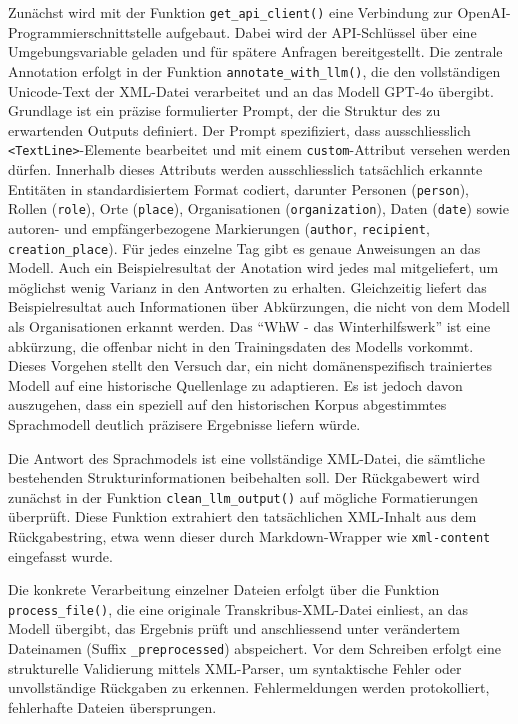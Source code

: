 \documentclass[12pt, a4paper, ngerman, bidi=default]{article}
\newcommand{\code}[1]{\colorbox{VeryLightGray}{\texttt{#1}}} %
\begin{document}
Zunächst wird mit der Funktion \code{get\_api\_client()} eine Verbindung zur OpenAI-Programmierschnittstelle 
aufgebaut. Dabei wird der API-Schlüssel über eine Umgebungsvariable geladen und für spätere Anfragen bereitgestellt.
Die zentrale Annotation erfolgt in der Funktion \code{annotate\_with\_llm()}, die den vollständigen Unicode-Text der XML-Datei
verarbeitet und an das Modell GPT-4o übergibt. Grundlage ist ein präzise formulierter Prompt, der die Struktur des zu erwartenden
Outputs definiert. Der Prompt spezifiziert, dass ausschliesslich \code{<TextLine>}-Elemente bearbeitet und mit einem \code{custom}-Attribut
versehen werden dürfen. Innerhalb dieses Attributs werden ausschliesslich tatsächlich erkannte Entitäten in standardisiertem Format codiert, 
darunter Personen (\code{person}), Rollen (\code{role}), Orte (\code{place}), Organisationen (\code{organization}), Daten (\code{date}) 
sowie autoren- und empfängerbezogene Markierungen (\code{author}, \code{recipient}, \code{creation\_place}). Für jedes einzelne Tag gibt es genaue Anweisungen
an das Modell. Auch ein Beispielresultat der Anotation wird jedes mal mitgeliefert, um möglichst wenig Varianz in den Antworten zu erhalten. Gleichzeitig liefert
das Beispielresultat auch Informationen über Abkürzungen, die nicht von dem Modell als Organisationen erkannt werden. Das \enquote{WhW - das Winterhilfswerk} ist eine
abkürzung, die offenbar nicht in den Trainingsdaten des Modells vorkommt. Dieses Vorgehen stellt den Versuch dar, ein nicht domänenspezifisch trainiertes Modell 
auf eine historische Quellenlage zu adaptieren. Es ist jedoch davon auszugehen, dass ein speziell auf den historischen Korpus abgestimmtes Sprachmodell 
deutlich präzisere Ergebnisse liefern würde.

Die Antwort des Sprachmodels ist eine vollständige XML-Datei, die sämtliche bestehenden Strukturinformationen beibehalten soll. 
Der Rückgabewert wird zunächst in der Funktion \code{clean\_llm\_output()} auf mögliche Formatierungen überprüft. Diese Funktion 
extrahiert den tatsächlichen XML-Inhalt aus dem Rückgabestring, etwa wenn dieser durch Markdown-Wrapper 
wie \code{\textasciigrave\textasciigrave\textasciigrave xml-content\textquotesingle\textquotesingle\textquotesingle} eingefasst wurde.


Die konkrete Verarbeitung einzelner Dateien erfolgt über die Funktion \code{process\_file()}, die eine originale Transkribus-XML-Datei einliest,
an das Modell übergibt, das Ergebnis prüft und anschliessend unter verändertem Dateinamen (Suffix \code{\_preprocessed}) abspeichert. Vor dem 
Schreiben erfolgt eine strukturelle Validierung mittels XML-Parser, um syntaktische Fehler oder unvollständige Rückgaben zu 
erkennen. Fehlermeldungen werden protokolliert, fehlerhafte Dateien übersprungen.
\end{document}
